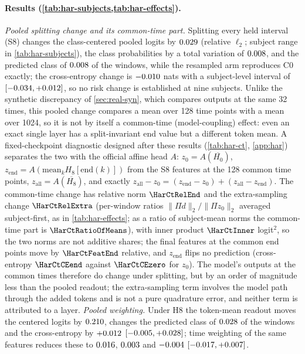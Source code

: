 \documentclass{article}
\theoremstyle{plain}
\theoremstyle{definition}
\theoremstyle{remark}
\begin{document}



\paragraph{Results (\cref{tab:har-subjects,tab:har-effects}).}
\emph{Pooled splitting change and its common-time part.}
Splitting every held interval (S8) changes the class-centered pooled logits by $0.029$ (relative $\ell_2$; subject range in \cref{tab:har-subjects}), the class probabilities by a total variation of $0.008$, and the predicted class of $0.008$ of the windows, while the resampled arm reproduces C0 exactly; the cross-entropy change is $-0.010$ nats with a subject-level interval of $[-0.034,+0.012]$, so no risk change is established at nine subjects.
Unlike the synthetic discrepancy of \cref{sec:real-syn}, which compares outputs at the same 32 times, this pooled change compares a mean over 128 time points with a mean over 1024, so it is not by itself a common-time (model-coupling) effect: even an exact single layer has a split-invariant end value but a different token mean.
A fixed-checkpoint diagnostic designed after these results (\cref{tab:har-ct}, \cref{app:har}) separates the two with the official affine head $A$: $z_0=A(\overline{H_0})$, $z_{\mathrm{end}}=A(\mathrm{mean}_kH_8[\mathrm{end}(k)])$ from the S8 features at the 128 common time points, $z_{\mathrm{all}}=A(\overline{H_8})$, and exactly $z_{\mathrm{all}}-z_0=(z_{\mathrm{end}}-z_0)+(z_{\mathrm{all}}-z_{\mathrm{end}})$.
The common-time change has relative norm $\HarCtRelEnd$ and the extra-sampling change $\HarCtRelExtra$ (per-window ratios $\|\Pi d\|_2/\|\Pi z_0\|_2$ averaged subject-first, as in \cref{tab:har-effects}; as a ratio of subject-mean norms the common-time part is $\HarCtRatioOfMeans$), with inner product $\HarCtInner$ logit$^2$, so the two norms are not additive shares; the final features at the common end points move by $\HarCtFeatEnd$ relative, and $z_{\mathrm{end}}$ flips no prediction (cross-entropy $\HarCtCEend$ against $\HarCtCEzero$ for $z_0$).
The model's outputs at the common times therefore do change under splitting, but by an order of magnitude less than the pooled readout; the extra-sampling term involves the model path through the added tokens and is not a pure quadrature error, and neither term is attributed to a layer.
\emph{Pooled weighting.}
Under H8 the token-mean readout moves the centered logits by $0.210$, changes the predicted class of $0.028$ of the windows and the cross-entropy by $+0.012$ $[-0.005,+0.028]$; time weighting of the same features reduces these to $0.016$, $0.003$ and $-0.004$ $[-0.017,+0.007]$.
\end{document}
